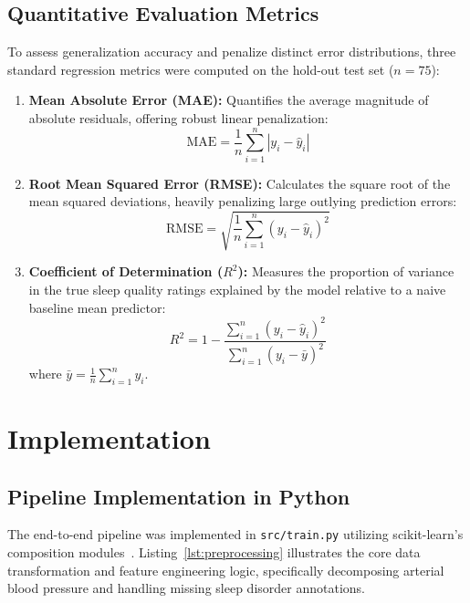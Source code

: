\documentclass[12pt,a4paper]{article}
\begin{document}
\subsection{Quantitative Evaluation Metrics}
To assess generalization accuracy and penalize distinct error distributions, three standard regression metrics were computed on the hold-out test set ($n = 75$):
\begin{enumerate}
    \item \textbf{Mean Absolute Error (MAE):} Quantifies the average magnitude of absolute residuals, offering robust linear penalization:
    \begin{equation}
        \text{MAE} = \frac{1}{n} \sum_{i=1}^n \left| y_i - \hat{y}_i \right|
    \end{equation}
    \item \textbf{Root Mean Squared Error (RMSE):} Calculates the square root of the mean squared deviations, heavily penalizing large outlying prediction errors:
    \begin{equation}
        \text{RMSE} = \sqrt{\frac{1}{n} \sum_{i=1}^n \left( y_i - \hat{y}_i \right)^2}
    \end{equation}
    \item \textbf{Coefficient of Determination ($R^2$):} Measures the proportion of variance in the true sleep quality ratings explained by the model relative to a naive baseline mean predictor:
    \begin{equation}
        R^2 = 1 - \frac{\sum_{i=1}^n \left( y_i - \hat{y}_i \right)^2}{\sum_{i=1}^n \left( y_i - \bar{y} \right)^2}
    \end{equation}
    where $\bar{y} = \frac{1}{n} \sum_{i=1}^n y_i$.
\end{enumerate}

\section{Implementation}

\subsection{Pipeline Implementation in Python}
The end-to-end pipeline was implemented in \texttt{src/train.py} utilizing scikit-learn's composition modules~\cite{scikit_learn}. Listing~\ref{lst:preprocessing} illustrates the core data transformation and feature engineering logic, specifically decomposing arterial blood pressure and handling missing sleep disorder annotations.
\end{document}

